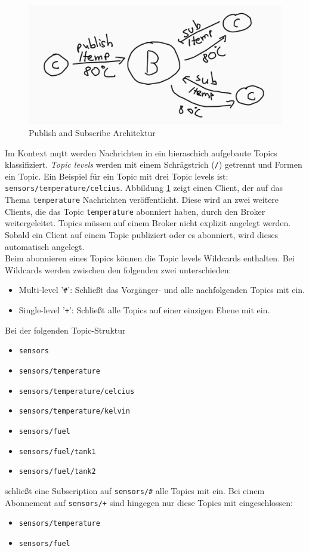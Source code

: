 \begin{figure}
    \centering
    \includegraphics[scale=0.5]{images/publish_subscribe.png}
    \caption{Publish and Subscribe Architektur}
    \label{fig:publish-subscribe}
\end{figure}
Im Kontext \ac{mqtt} werden Nachrichten in ein hieraschich aufgebaute Topics klassifiziert.
\textit{Topic levels} werden mit einem Schrägstrich (\verb|/|) getrennt und Formen ein Topic. Ein Beispiel für ein Topic mit drei Topic levels ist: \verb|sensors/temperature/celcius|.
Abbildung \ref{fig:publish-subscribe} zeigt einen Client, der auf das Thema \verb|temperature| Nachrichten veröffentlicht. Diese wird an zwei weitere Clients, die das Topic \verb|temperature| abonniert haben, durch den Broker weitergeleitet. Topics müssen auf einem Broker nicht explizit angelegt werden. Sobald ein Client auf einem Topic publiziert oder es abonniert, wird dieses automatisch angelegt.\cite{WhatMQTTDefinition}\\
Beim abonnieren eines Topics können die Topic levels Wildcards enthalten. Bei Wildcards werden zwischen den folgenden zwei unterschieden:\cite{mqtt5Specification}
\begin{itemize}
    \item Multi-level '\verb|#|': Schlie{\ss}t das Vorgänger- und alle nachfolgenden Topics mit ein.
    \item Single-level '\verb|+|': Schlie{\ss}t alle Topics auf einer einzigen Ebene mit ein.
\end{itemize}
Bei der folgenden Topic-Struktur
\begin{itemize}
    \item \verb|sensors|
    \item \verb|sensors/temperature|
    \item \verb|sensors/temperature/celcius|
    \item \verb|sensors/temperature/kelvin|
    \item \verb|sensors/fuel|
    \item \verb|sensors/fuel/tank1|
    \item \verb|sensors/fuel/tank2|
\end{itemize}
schlie{\ss}t eine Subscription auf \verb|sensors/#| alle Topics mit ein. Bei einem Abonnement auf \verb|sensors/+| sind hingegen nur diese Topics mit eingeschlossen:
\begin{itemize}
    \item \verb|sensors/temperature|
    \item \verb|sensors/fuel|
\end{itemize}


